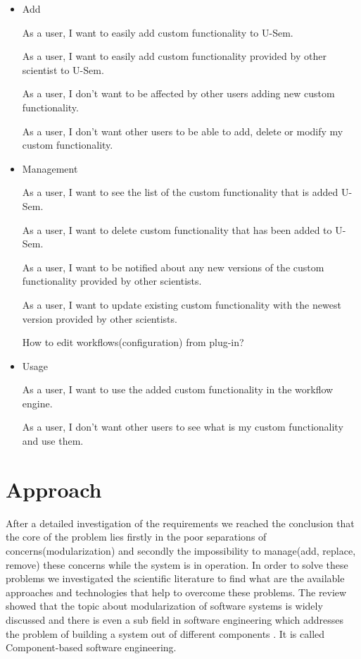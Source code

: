 \begin{itemize}
	\item Add
	
	As a user, I want to easily add custom functionality to U-Sem.
	
	As a user, I want to easily add custom functionality provided by other scientist to U-Sem.
	
	As a user, I don't want to be affected by other users adding new custom functionality.
	
	As a user, I don't want other users to be able to add, delete or modify my custom functionality.
	

	\item Management
	
	As a user, I want to see the list of the custom functionality that is added U-Sem.
	
	As a user, I want to delete custom functionality that has been added to U-Sem.
	
	As a user, I want to be notified about any new versions of the custom functionality provided by other scientists.
	
	As a user, I want to update existing custom functionality with the newest version provided by other scientists.
	
	How to edit workflows(configuration) from plug-in?
	
	\item Usage
	
	As a user, I want to use the added custom functionality in the workflow engine.
	
	As a user, I don't want other users to see what is my custom functionality and use them.

	
\end{itemize}

\section{Approach}

After a detailed investigation of the requirements we reached the conclusion that the core of the problem lies firstly in the poor separations of concerns(modularization) and secondly the impossibility to manage(add, replace, remove) these concerns while the system is in operation. In order to solve these problems we investigated the scientific literature to find what are the available approaches and technologies that help to overcome these problems. The review showed that the topic about modularization of software systems is widely discussed and there is even a sub field in software engineering which addresses the problem of building a system out of different components \cite{Jifeng}. It is called Component-based software engineering. 

